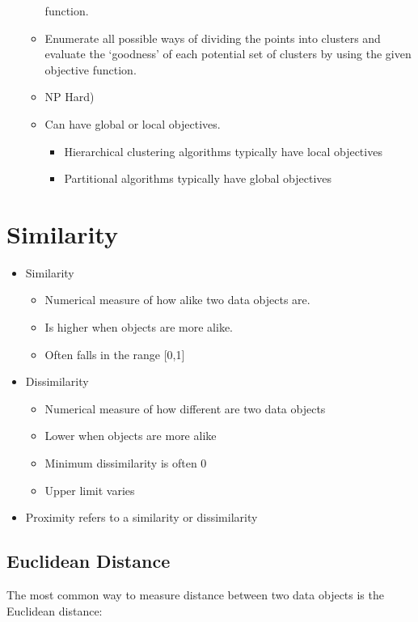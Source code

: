 \begin{itemize}
\begin{itemize}
function.
	\item Enumerate all possible ways of dividing the points into
clusters and evaluate the `goodness' of each potential
set of clusters by using the given objective function.
	\item NP Hard)
	\item Can have global or local objectives.
	\begin{itemize}
		\item Hierarchical clustering algorithms typically have local objectives
		\item Partitional algorithms typically have global objectives
	\end{itemize}
\end{itemize}
\end{itemize}

\newpage
\section{Similarity}
\begin{itemize}
    \item Similarity
          \begin{itemize}
              \item Numerical measure of how alike two data objects are.
              \item Is higher when objects are more alike.
              \item Often falls in the range [0,1]
          \end{itemize}
    \item Dissimilarity
          \begin{itemize}
              \item Numerical measure of how different are two data objects
              \item Lower when objects are more alike
              \item Minimum dissimilarity is often 0
              \item Upper limit varies
          \end{itemize}
    \item Proximity refers to a similarity or dissimilarity
\end{itemize}

\subsection{Euclidean Distance}
The most common way to measure distance between two data objects is the Euclidean distance:

